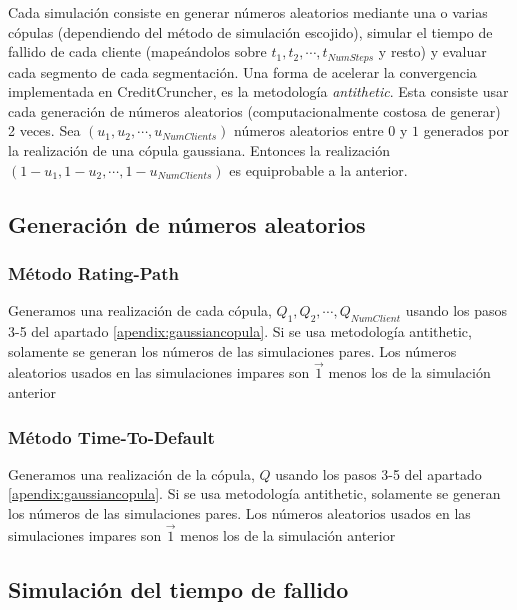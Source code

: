 Cada simulaci\'on consiste en generar n\'umeros aleatorios
mediante una o varias c\'opulas (dependiendo del m\'etodo de
simulaci\'on escojido), simular el tiempo de fallido de cada
cliente (mape\'andolos sobre $t_1, t_2, \cdots, t_{NumSteps}$ y
resto) y evaluar cada segmento de cada segmentaci\'on.
\newline
\newline
Una forma de acelerar la convergencia implementada en CreditCruncher,
es la metodolog\'ia \emph{antithetic}. Esta consiste
usar cada generaci\'on de n\'umeros aleatorios (computacionalmente
costosa de generar) 2 veces. Sea $(u_1, u_2, \cdots, u_{NumClients})$
n\'umeros aleatorios entre $0$ y $1$ generados por la realizaci\'on
de una c\'opula gaussiana. Entonces la realizaci\'on
$(1-u_1, 1-u_2, \cdots, 1-u_{NumClients})$ es equiprobable a la anterior.

\subsection{Generaci\'on de n\'umeros aleatorios}

\subsubsection{M\'etodo Rating-Path}

Generamos una realizaci\'on de cada c\'opula, $Q_1, Q_2, \cdots, Q_{NumClient}$
usando los pasos 3-5 del apartado \ref{apendix:gaussiancopula}.
\newline
\newline
Si se usa metodolog\'ia antithetic, solamente se generan los n\'umeros
de las simulaciones pares. Los n\'umeros aleatorios usados en las simulaciones
impares son $\vec{1}$ menos los de la simulaci\'on anterior 

\subsubsection{M\'etodo Time-To-Default}

Generamos una realizaci\'on de la c\'opula, $Q$ usando los pasos 3-5
del apartado \ref{apendix:gaussiancopula}.
\newline
\newline
Si se usa metodolog\'ia antithetic, solamente se generan los n\'umeros
de las simulaciones pares. Los n\'umeros aleatorios usados en las simulaciones
impares son $\vec{1}$ menos los de la simulaci\'on anterior 

\subsection{Simulaci\'on del tiempo de fallido}

